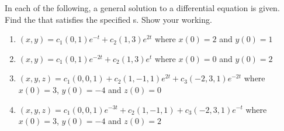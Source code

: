 \begin{exercise}  
In each of the following, a general solution to a differential equation is given.  
Find the  that satisfies the specified s.
Show your working.
\begin{enumerate}
\item \((x,y)=c_1(0,1)e^{-t}+c_2(1,3)e^{2t}\) where \(x(0)=2\) and \(y(0)=1\)

\item \((x,y)=c_1(0,1)e^{-2t}+c_2(1,3)e^{t}\) where \(x(0)=0\) and \(y(0)=2\)


\item \((x,y,z)=c_1(0,0,1) +c_2(1,-1,1)e^{2t} +c_3(-2,3,1)e^{-2t}\) where \(x(0)=3\), \(y(0)=-4\) and \(z(0)=0\)

\item \((x,y,z)=c_1(0,0,1)e^{-3t} +c_2(1,-1,1) +c_3(-2,3,1)e^{-t}\) where \(x(0)=3\), \(y(0)=-4\) and \(z(0)=2\)

\end{enumerate}
\end{exercise}








